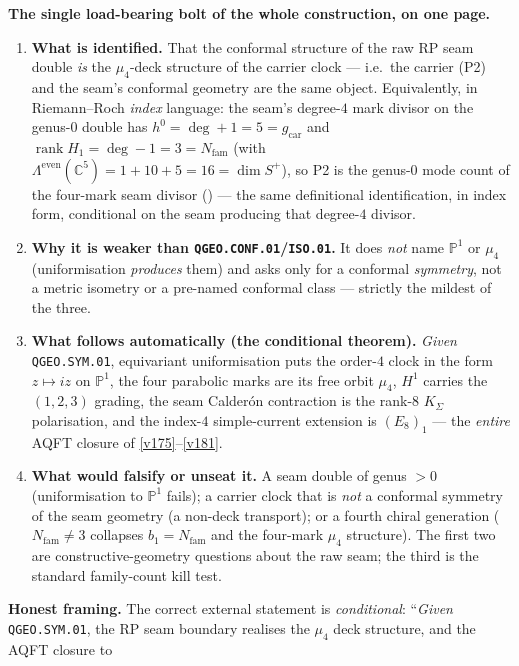\documentclass[11pt,a4paper]{article}
\newcommand{\Nfam}{N_{\mathrm{fam}}}
\newcommand{\gcar}{g_{\mathrm{car}}}
\newcommand{\PP}{\mathbb P^1}
\begin{document}
\begin{keybox}
\textbf{The single load-bearing bolt of the whole construction, on one page.}
\begin{enumerate}[leftmargin=1.6em,itemsep=1pt]
\item \textbf{What is identified.} That the conformal structure of the raw RP seam double \emph{is} the
$\mu_4$-deck structure of the carrier clock --- i.e.\ the carrier (P2) and the seam's conformal geometry
are the same object. Equivalently, in Riemann--Roch \emph{index} language: the seam's degree-$4$ mark
divisor on the genus-$0$ double has $h^0=\deg{+}1=5=\gcar$ and $\operatorname{rank}H_1=\deg{-}1=3=\Nfam$
(with $\Lambda^{\mathrm{even}}(\mathbb C^5)=1{+}10{+}5=16=\dim S^+$), so P2 is the genus-$0$ mode count of the
four-mark seam divisor () --- the same definitional identification, in index
form, conditional on the seam producing that degree-$4$ divisor.
\item \textbf{Why it is weaker than \texttt{QGEO.CONF.01}/\texttt{ISO.01}.} It does \emph{not} name
$\PP$ or $\mu_4$ (uniformisation \emph{produces} them) and asks only for a conformal \emph{symmetry},
not a metric isometry or a pre-named conformal class --- strictly the mildest of the three.
\item \textbf{What follows automatically (the conditional theorem).} \emph{Given} \texttt{QGEO.SYM.01},
equivariant uniformisation puts the order-$4$ clock in the form $z\mapsto iz$ on $\PP$, the four
parabolic marks are its free orbit $\mu_4$, $H^1$ carries the $(1,2,3)$ grading, the seam Calder\'on
contraction is the rank-$8$ $K_\Sigma$ polarisation, and the index-$4$ simple-current extension is
$(E_8)_1$ --- the \emph{entire} AQFT closure of \vref{v175}--\vref{v181}.
\item \textbf{What would falsify or unseat it.} A seam double of genus $>0$ (uniformisation to $\PP$
fails); a carrier clock that is \emph{not} a conformal symmetry of the seam geometry (a non-deck
transport); or a fourth chiral generation ($\Nfam\neq3$ collapses $b_1=\Nfam$ and the four-mark $\mu_4$
structure). The first two are constructive-geometry questions about the raw seam; the third is the
standard family-count kill test.
\end{enumerate}
\noindent\textbf{Honest framing.} The correct external statement is \emph{conditional}: ``\emph{Given}
\texttt{QGEO.SYM.01}, the RP seam boundary realises the $\mu_4$ deck structure, and the AQFT closure to

\end{keybox}
\end{document}
